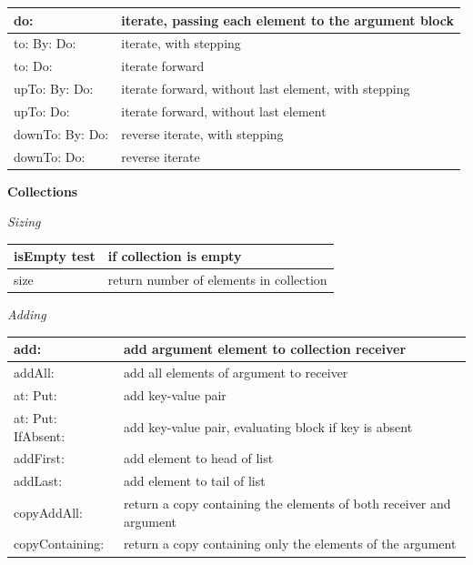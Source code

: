 \documentclass[letterpaper,10pt,english]{sphinxmanual}
\begin{document}
\begin{tabulary}{\linewidth}{p{5cm} p{10cm}}
\hline

do:
 & 
iterate, passing each element to the argument block
\\\hline

to: By: Do:
 & 
iterate, with stepping
\\\hline

to: Do:
 & 
iterate forward
\\\hline

upTo: By: Do:
 & 
iterate forward, without last element, with stepping
\\\hline

upTo: Do:
 & 
iterate forward, without last element
\\\hline

downTo: By: Do:
 & 
reverse iterate, with stepping
\\\hline

downTo: Do:
 & 
reverse iterate
\\\hline
\end{tabulary}


\textbf{Collections}

\emph{Sizing}

\begin{tabulary}{\linewidth}{p{5cm} p{10cm}}
\hline

isEmpty test
 & 
if collection is empty
\\\hline

size
 & 
return number of elements in collection
\\\hline
\end{tabulary}


\emph{Adding}

\begin{tabulary}{\linewidth}{p{5cm} p{10cm}}
\hline

add:
 & 
add argument element to collection receiver
\\\hline

addAll:
 & 
add all elements of argument to receiver
\\\hline

at: Put:
 & 
add key-value pair
\\\hline

at: Put: IfAbsent:
 & 
add key-value pair, evaluating block if key is absent
\\\hline

addFirst:
 & 
add element to head of list
\\\hline

addLast:
 & 
add element to tail of list
\\\hline

copyAddAll:
 & 
return a copy containing the elements of both receiver and argument
\\\hline

copyContaining:
 & 
return a copy containing only the elements of the argument
\\\hline
\end{tabulary}
\end{document}
